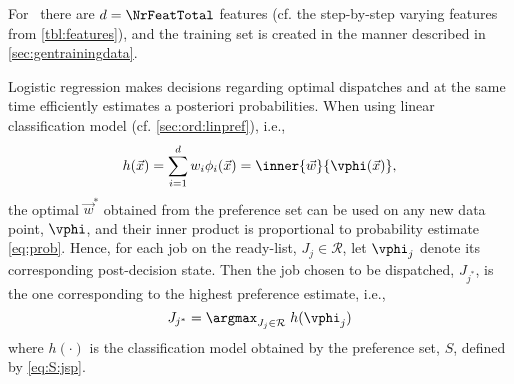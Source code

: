 For \jsp\ there are $d=\NrFeatTotal$ features (cf. the step-by-step varying features from \cref{tbl:features}), and the training set is created in the manner described in \cref{sec:gentrainingdata}.

Logistic regression makes decisions regarding optimal dispatches and at the same time efficiently estimates a posteriori probabilities. When using linear classification model (cf. \cref{sec:ord:linpref}), i.e., 
\begin{equation}\label{eq:jsp:linweights}
h(\vec{x})=\sum_{i=1}^d w_i\phi_i(\vec{x})=\inner{\vec{w}}{\vphi(\vec{x})},
\end{equation}
the optimal $\vec{w}^*$ obtained from the preference set can be used on any new data point, $\vphi$, and their inner product is proportional to probability estimate \cref{eq:prob}. 
Hence, for each job on the ready-list, $J_j\in\mathcal{R}$, let $\vphi_j$ denote its corresponding  post-decision state. Then the job chosen to be dispatched, $J_{j^*}$, is the one corresponding to the highest preference estimate, i.e.,
\begin{equation}\label{eq:lin}
J_{j^*}=\argmax_{J_j\in \mathcal{R}}\; h(\vphi_j)
\end{equation}
where $h(\cdot)$ is the classification model obtained by the preference set, $S$, defined by \cref{eq:S:jsp}. 

\clearpage

